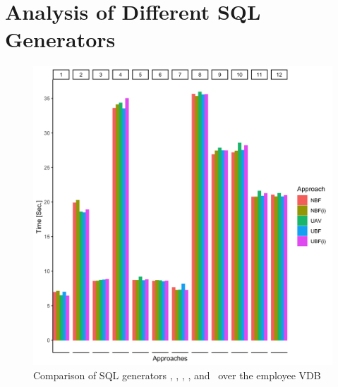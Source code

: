 \section{Analysis of Different SQL Generators}
\label{sec:exp-gen}



\begin{figure}
\centering
\includegraphics[scale=0.12] {figs/plots/emp1-5.png}
\caption[Comparison of SQL generators \nbf, \nbfi, \uav, \ubf, and \ubfi\ over the employee VDB]{Comparison of SQL generators \nbf, \nbfi, \uav, \ubf, and \ubfi\ over the employee VDB}
\label{fig:emp1-5}
\end{figure}



